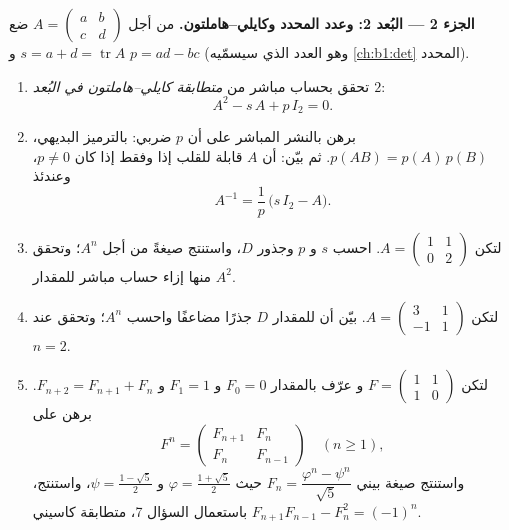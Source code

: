 \begin{problem}
\medskip
\noindent\textbf{الجزء 2 --- البُعد 2:  وعدد
المحدد وكايلي--هاملتون.} من أجل $A = \begin{pmatrix} a & b\\ c &
d\end{pmatrix}$ ضع $s = a + d = \operatorname{tr} A$ و $p = ad
- bc$ (وهو العدد الذي سيسمّيه \cref{ch:b1:det}
المحدد).
\begin{enumerate}[resume]
  \item تحقق بحساب مباشر من \emph{متطابقة كايلي--هاملتون
        في البُعد $2$}:
        \[
        A^2 - s\,A + p\,I_2 = 0 .
        \]
  \item برهن بالنشر المباشر على أن $p$ ضربي:
        بالترميز البديهي، $p(AB) = p(A)\,p(B)$. ثم بيّن:
        أن $A$ قابلة للقلب إذا وفقط إذا كان $p \neq 0$، وعندئذ
        \[
        A^{-1} = \frac1p\,\bigl(s\,I_2 - A\bigr).
        \]
  \item لتكن $A = \begin{pmatrix} 1 & 1\\ 0 & 2\end{pmatrix}$.
        احسب $s$ و $p$ وجذور $D$، واستنتج صيغةً
         من أجل $A^n$؛ وتحقق منها إزاء حساب مباشر
        للمقدار $A^2$.
  \item لتكن $A = \begin{pmatrix} 3 & 1\\ -1 & 1\end{pmatrix}$.
        بيّن أن للمقدار $D$ جذرًا مضاعفًا واحسب $A^n$؛ وتحقق
        عند $n = 2$.
  \item لتكن $F = \begin{pmatrix} 1 & 1\\ 1 & 0\end{pmatrix}$ و
        عرّف  بالمقدار $F_0 = 0$ و $F_1 = 1$ و
        $F_{n+2} = F_{n+1} + F_n$. برهن على
        \[
        F^n = \begin{pmatrix} F_{n+1} & F_n\\ F_n &
        F_{n-1}\end{pmatrix} \quad (n \geq 1),
        \]
        واستنتج صيغة بيني $F_n = \dfrac{\varphi^n -
        \psi^n}{\sqrt5}$ حيث $\varphi = \frac{1 + \sqrt5}2$ و
        $\psi = \frac{1 - \sqrt5}2$، واستنتج، باستعمال السؤال 7،
        متطابقة كاسيني $F_{n+1}F_{n-1} - F_n^2 = (-1)^n$.
\end{enumerate}


\end{problem}
